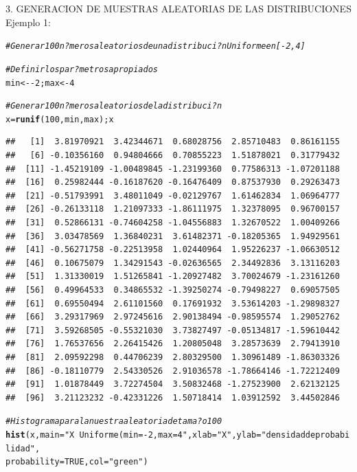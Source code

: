 \documentclass[10pt,a4paper]{article}\usepackage[]{graphicx}\usepackage[]{color}
\makeatletter
\newcommand{\hlnum}[1]{\textcolor[rgb]{0.686,0.059,0.569}{#1}}%
\newcommand{\hlstr}[1]{\textcolor[rgb]{0.192,0.494,0.8}{#1}}%
\newcommand{\hlcom}[1]{\textcolor[rgb]{0.678,0.584,0.686}{\textit{#1}}}%
\newcommand{\hlopt}[1]{\textcolor[rgb]{0,0,0}{#1}}%
\newcommand{\hlstd}[1]{\textcolor[rgb]{0.345,0.345,0.345}{#1}}%
\newcommand{\hlkwb}[1]{\textcolor[rgb]{0.69,0.353,0.396}{#1}}%
\newcommand{\hlkwc}[1]{\textcolor[rgb]{0.333,0.667,0.333}{#1}}%
\newcommand{\hlkwd}[1]{\textcolor[rgb]{0.737,0.353,0.396}{\textbf{#1}}}%
\newenvironment{kframe}{%
 \def\at@end@of@kframe{}%
 \ifinner\ifhmode%
  \def\at@end@of@kframe{\end{minipage}}%
  \begin{minipage}{\columnwidth}%
 \fi\fi%
 \def\FrameCommand##1{\hskip\@totalleftmargin \hskip-\fboxsep
 \colorbox{shadecolor}{##1}\hskip-\fboxsep
     \hskip-\linewidth \hskip-\@totalleftmargin \hskip\columnwidth}%
 \MakeFramed {\advance\hsize-\width
   \@totalleftmargin\z@ \linewidth\hsize
   \@setminipage}}%
 {\par\unskip\endMakeFramed%
 \at@end@of@kframe}
\newenvironment{knitrout}{}{} %
\makeatother
\begin{document}
3. GENERACION DE MUESTRAS ALEATORIAS DE LAS DISTRIBUCIONES
Ejemplo 1: 
\begin{knitrout}
\color{fgcolor}\begin{kframe}
\begin{alltt}
\hlcom{#Generar 100 n?meros aleatorios de una distribuci?n Uniforme en [-2, 4] }

\hlcom{#Definir los par?metros apropiados }
\hlstd{min} \hlkwb{<-} \hlopt{-}\hlnum{2}\hlstd{; max} \hlkwb{<-} \hlnum{4}

\hlcom{#Generar 100 n?meros aleatorios de la distribuci?n }
\hlstd{x} \hlkwb{=} \hlkwd{runif}\hlstd{(}\hlnum{100}\hlstd{, min, max); x}
\end{alltt}
\begin{verbatim}
##   [1]  3.81970921  3.42344671  0.68028756  2.85710483  0.86161155
##   [6] -0.10356160  0.94804666  0.70855223  1.51878021  0.31779432
##  [11] -1.45219109 -1.00489845 -1.23199360  0.77586313 -1.07201188
##  [16]  0.25982444 -0.16187620 -0.16476409  0.87537930  0.29263473
##  [21] -0.51793991  3.48011049 -0.02129767  1.61462834  1.06964777
##  [26] -0.26133118  1.21097333 -1.86111975  1.32378095  0.96700157
##  [31]  0.52866131 -0.74604258 -1.04556883  1.32670522  1.00409266
##  [36]  3.03478569  1.36840231  3.61482371 -0.18205365  1.94929561
##  [41] -0.56271758 -0.22513958  1.02440964  1.95226237 -1.06630512
##  [46]  0.10675079  1.34291543 -0.02636565  2.34492836  3.13116203
##  [51]  1.31330019  1.51265841 -1.20927482  3.70024679 -1.23161260
##  [56]  0.49964533  0.34865532 -1.39250274 -0.79498227  0.69057505
##  [61]  0.69550494  2.61101560  0.17691932  3.53614203 -1.29898327
##  [66]  3.29317969  2.97245616  2.90138494 -0.98595574  1.29052762
##  [71]  3.59268505 -0.55321030  3.73827497 -0.05134817 -1.59610442
##  [76]  1.76537656  2.26415426  1.20805048  3.28573639  2.79413910
##  [81]  2.09592298  0.44706239  2.80329500  1.30961489 -1.86303326
##  [86] -0.18110779  2.54330526  2.91036578 -1.78664146 -1.72212409
##  [91]  1.01878449  3.72274504  3.50832468 -1.27523900  2.62132125
##  [96]  3.21123232 -0.42331226  1.50718414  1.03912592  3.44502846
\end{verbatim}
\begin{alltt}
\hlcom{#Histograma para la nuestra aleatoria de tama?o 100 }
\hlkwd{hist}\hlstd{(x,} \hlkwc{main}\hlstd{=}\hlstr{"X ~ Uniforme(min=-2, max=4"}\hlstd{,} \hlkwc{xlab}\hlstd{=}\hlstr{"X"}\hlstd{,} \hlkwc{ylab}\hlstd{=}\hlstr{"densidad de probabilidad"}\hlstd{,}
     \hlkwc{probability}\hlstd{=}\hlnum{TRUE}\hlstd{,} \hlkwc{col}\hlstd{=}\hlstr{"green"}\hlstd{)}


\end{alltt}
\end{kframe}
\end{knitrout}
\end{document}
